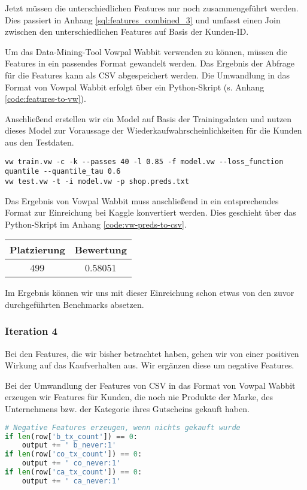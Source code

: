 Jetzt müssen die unterschiedlichen Features nur noch zusammengeführt werden. Dies passiert
in Anhang \ref{sql:features_combined_3} und umfasst einen Join zwischen den
unterschiedlichen Features auf Basis der Kunden-ID.

Um das Data-Mining-Tool Vowpal Wabbit verwenden zu können, müssen die Features in ein
passendes Format gewandelt werden. Das Ergebnis der Abfrage für die Features kann
als CSV abgespeichert werden. Die Umwandlung in das Format von Vowpal Wabbit
erfolgt über ein Python-Skript (s. Anhang \ref{code:features-to-vw}).

Anschließend erstellen wir ein Model auf Basis der Trainingsdaten und nutzen dieses
Model zur Voraussage der Wiederkaufwahrscheinlichkeiten für die Kunden aus den Testdaten.
\begin{lstlisting}
vw train.vw -c -k --passes 40 -l 0.85 -f model.vw --loss_function quantile --quantile_tau 0.6
vw test.vw -t -i model.vw -p shop.preds.txt
\end{lstlisting}

Das Ergebnis von Vowpal Wabbit muss anschließend in ein entsprechendes Format zur Einreichung bei 
Kaggle konvertiert werden. Dies geschieht über das Python-Skript im Anhang 
\ref{code:vw-preds-to-csv}. 

\begin{tabular}{|c|c|}
	\hline \textbf{Platzierung} & \textbf{Bewertung} \\ 
	\hline 499 & 0.58051  \\ 
	\hline 
\end{tabular}

Im Ergebnis können wir uns mit dieser Einreichung
schon etwas von den zuvor durchgeführten Benchmarks absetzen.

\subsubsection{Iteration 4}
Bei den Features, die wir bisher betrachtet haben, gehen wir von einer
positiven Wirkung auf das Kaufverhalten aus. Wir ergänzen diese um negative Features.

Bei der Umwandlung der Features von CSV in das Format von Vowpal Wabbit 
erzeugen wir Features für Kunden, die noch nie Produkte der Marke,
des Unternehmens bzw. der Kategorie ihres Gutscheins gekauft haben.
\begin{lstlisting}[language=Python]
# Negative Features erzeugen, wenn nichts gekauft wurde
if len(row['b_tx_count']) == 0:
	output += ' b_never:1'
if len(row['co_tx_count']) == 0:
	output += ' co_never:1'
if len(row['ca_tx_count']) == 0:
	output += ' ca_never:1'
\end{lstlisting}


